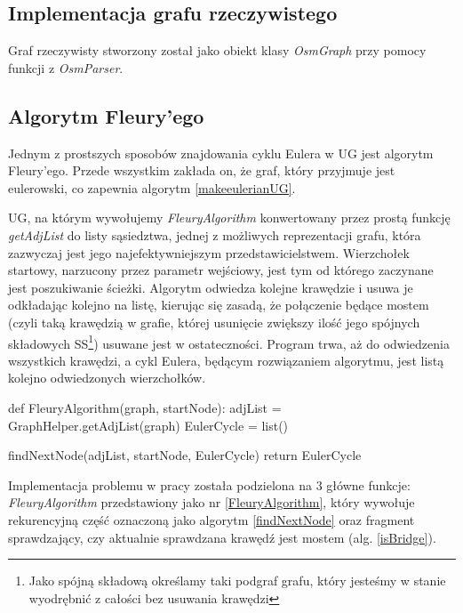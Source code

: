 \documentclass[a4paper, 12pt, twoside, openright]{article}
\begin{document}
\subsection{Implementacja grafu rzeczywistego}
\indent\par
Graf rzeczywisty stworzony został  jako obiekt klasy \textit{OsmGraph} przy pomocy funkcji z \textit{OsmParser}.



\subsection{Algorytm Fleury’ego} \label{FleuryAlgo}
\indent\par
	Jednym z prostszych sposobów znajdowania cyklu Eulera w UG jest algorytm Fleury'ego. Przede wszystkim zakłada on, że graf, który przyjmuje jest eulerowski, co zapewnia algorytm \ref{makeeulerianUG}. 
	
	UG, na którym wywołujemy \textit{FleuryAlgorithm} konwertowany przez prostą funkcję \textit{getAdjList} do listy sąsiedztwa, jednej z możliwych reprezentacji grafu, która zazwyczaj jest jego najefektywniejszym przedstawicielstwem. Wierzchołek startowy, narzucony przez parametr wejściowy, jest tym od którego zaczynane jest poszukiwanie ścieżki. Algorytm odwiedza kolejne krawędzie i usuwa je odkładając kolejno na listę, kierując się zasadą, że połączenie będące mostem (czyli taką krawędzią w grafie, której usunięcie zwiększy ilość jego spójnych składowych SS\footnote{ Jako spójną składową określamy taki podgraf grafu, który jesteśmy w stanie wyodrębnić z całości bez usuwania krawędzi}) usuwane jest w ostateczności. Program trwa, aż do odwiedzenia wszystkich krawędzi, a cykl Eulera, będącym rozwiązaniem algorytmu, jest listą kolejno odwiedzonych wierzchołków.

\begin{algorithm}[caption={\textit{FleuryAlgorithm} wyszukujący ścieżkę w grafie nieskierowanym}, label={FleuryAlgorithm}]
def FleuryAlgorithm(graph, startNode):
	adjList = GraphHelper.getAdjList(graph)
	EulerCycle = list()
	
	findNextNode(adjList, startNode, EulerCycle)
	return EulerCycle
\end{algorithm}

	Implementacja problemu w pracy została podzielona na 3 główne funkcje: \textit{FleuryAlgorithm} przedstawiony jako nr \ref{FleuryAlgorithm}, który wywołuje rekurencyjną część oznaczoną jako algorytm \ref{findNextNode} oraz fragment sprawdzający, czy aktualnie sprawdzana krawędź jest mostem (alg. \ref{isBridge}).
 
\end{document}

